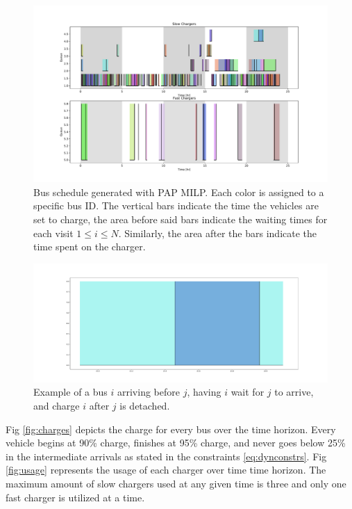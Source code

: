 \documentclass[letterpaper, 10pt, conference]{IEEEtran}
\begin{document}
\begin{figure}[ht]
	\centering
	\includegraphics[trim=1.5in 0.25in 1.5in 0.5in, width=\linewidth]{schedule.pdf}
	\caption{Bus schedule generated with PAP MILP. Each color is assigned to a specific bus ID. The vertical bars indicate the time the vehicles are set to charge, the area before said bars indicate the waiting times for each visit $1 \leq i \leq N$. Similarly, the area after the bars indicate the time spent on the charger.}
	\label{fig:schedule}
\end{figure}

\begin{figure}[ht]
	\centering
	\includegraphics[trim=0in 0in 0in 0in, width=\linewidth]{unoptimal.pdf}
	\caption{Example of a bus $i$ arriving before $j$, having $i$ wait for $j$ to arrive, and charge $i$ after $j$ is detached.}
	\label{fig:unoptimal}
\end{figure}

Fig \ref{fig:charges} depicts the charge for every bus over the time horizon. Every vehicle begins at 90\% charge, finishes at 95\% charge, and never goes below 25\% in the intermediate arrivals as stated in the constraints \eqref{eq:dynconstrs}. Fig \ref{fig:usage} represents the usage of each charger over time time horizon. The maximum amount of slow chargers used at any given time is three and only one fast charger is utilized at a time.
\end{document}
